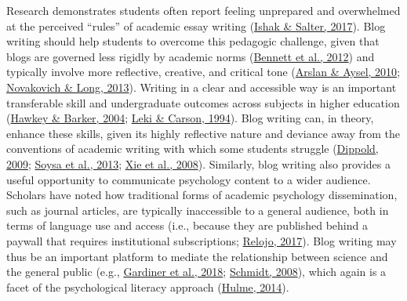 \documentclass[
  11pt,
  letterpaper,
  oneside,
  open=any]{scrbook}
\begin{document}
Research demonstrates students often report feeling unprepared and
overwhelmed at the perceived ``rules'' of academic essay writing
(\href{https://journals-sagepub-com.gold.idm.oclc.org/doi/full/10.1177/00986283211027278\#bibr36-00986283211027278}{Ishak
\& Salter, 2017}). Blog writing should help students to overcome this
pedagogic challenge, given that blogs are governed less rigidly by
academic norms
(\href{https://journals-sagepub-com.gold.idm.oclc.org/doi/full/10.1177/00986283211027278\#bibr6-00986283211027278}{Bennett
et al., 2012}) and typically involve more reflective, creative, and
critical tone
(\href{https://journals-sagepub-com.gold.idm.oclc.org/doi/full/10.1177/00986283211027278\#bibr5-00986283211027278}{Arslan
\& Aysel, 2010};
\href{https://journals-sagepub-com.gold.idm.oclc.org/doi/full/10.1177/00986283211027278\#bibr52-00986283211027278}{Novakovich
\& Long, 2013}). Writing in a clear and accessible way is an important
transferable skill and undergraduate outcomes across subjects in higher
education
(\href{https://journals-sagepub-com.gold.idm.oclc.org/doi/full/10.1177/00986283211027278\#bibr29-00986283211027278}{Hawkey
\& Barker, 2004};
\href{https://journals-sagepub-com.gold.idm.oclc.org/doi/full/10.1177/00986283211027278\#bibr42-00986283211027278}{Leki
\& Carson, 1994}). Blog writing can, in theory, enhance these skills,
given its highly reflective nature and deviance away from the
conventions of academic writing with which some students struggle
(\href{https://journals-sagepub-com.gold.idm.oclc.org/doi/full/10.1177/00986283211027278\#bibr19-00986283211027278}{Dippold,
2009};
\href{https://journals-sagepub-com.gold.idm.oclc.org/doi/full/10.1177/00986283211027278\#bibr59-00986283211027278}{Soysa
et al., 2013};
\href{https://journals-sagepub-com.gold.idm.oclc.org/doi/full/10.1177/00986283211027278\#bibr69-00986283211027278}{Xie
et al., 2008}). Similarly, blog writing also provides a useful
opportunity to communicate psychology content to a wider audience.
Scholars have noted how traditional forms of academic psychology
dissemination, such as journal articles, are typically inaccessible to a
general audience, both in terms of language use and access (i.e.,
because they are published behind a paywall that requires institutional
subscriptions;
\href{https://journals-sagepub-com.gold.idm.oclc.org/doi/full/10.1177/00986283211027278\#bibr55-00986283211027278}{Relojo,
2017}). Blog writing may thus be an important platform to mediate the
relationship between science and the general public (e.g.,
\href{https://journals-sagepub-com.gold.idm.oclc.org/doi/full/10.1177/00986283211027278\#bibr23-00986283211027278}{Gardiner
et al., 2018};
\href{https://journals-sagepub-com.gold.idm.oclc.org/doi/full/10.1177/00986283211027278\#bibr57-00986283211027278}{Schmidt,
2008}), which again is a facet of the psychological literacy approach
(\href{https://journals-sagepub-com.gold.idm.oclc.org/doi/full/10.1177/00986283211027278\#bibr33-00986283211027278}{Hulme,
2014}).
\end{document}
